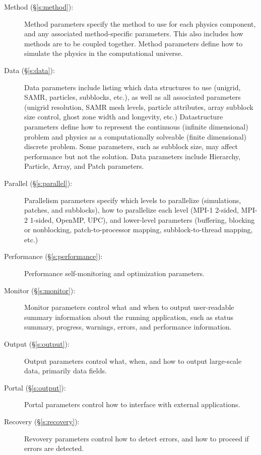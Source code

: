 \documentclass{book}
\begin{document}
\begin{description}
 \item [Method (\S\ref{s:method}): ] Method parameters specify the
 method to use for each physics component, and any associated
 method-specific parameters.  This also includes how methods are to be
 coupled together.  Method parameters define how to simulate the
 physics in the computational universe.

 \item [Data (\S\ref{s:data}): ] Data parameters include listing which
 data structures to use (unigrid, SAMR, particles, subblocks, etc.),
 as well as all associated parameters (unigrid resolution, SAMR mesh
 levels, particle attributes, array subblock size control, ghost zone
 width and longevity, etc.)  Datastructure parameters define how to
 represent the continuous (infinite dimensional) problem and physics
 as a computationally solveable (finite dimensional) discrete problem.
 Some parameters, such as subblock size, may affect performance but
 not the solution.  Data parameters include Hierarchy, Particle,
 Array, and Patch parameters.

 \item [Parallel (\S\ref{s:parallel}): ] Parallelism parameters
 specify which levels to parallelize (simulations, patches, and
 subblocks), how to parallelize each level (MPI-1 2-sided, MPI-2
 1-sided, OpenMP, UPC), and lower-level parameters (buffering,
 blocking or nonblocking, patch-to-processor mapping,
 subblock-to-thread mapping, etc.)

 \item [Performance (\S\ref{s:performance}): ] Performance
 self-monitoring and optimization parameters.

 \item [Monitor (\S\ref{s:monitor}): ] Monitor parameters control what
 and when to output user-readable summary information about the
 running application, such as status summary, progress, warnings,
 errors, and performance information.

 \item [Output (\S\ref{s:output}): ] Output parameters control
  what, when, and how to output large-scale data, primarily data fields.

 \item [Portal (\S\ref{s:output}): ] Portal parameters control
  how to interface with external applications.

 \item [Recovery (\S\ref{s:recovery}): ] Revovery parameters
  control how to detect errors, and how to proceed if errors
  are detected.

\end{description}
\end{document}

